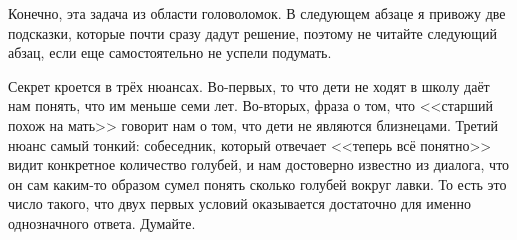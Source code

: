 Конечно, эта задача из области головоломок. В следующем абзаце я привожу две подсказки, которые почти сразу дадут решение, поэтому не читайте следующий абзац, если еще самостоятельно не успели подумать.

Секрет кроется в трёх нюансах. Во-первых, то что дети не ходят в школу даёт нам понять, что им меньше семи лет. Во-вторых, фраза о том, что <<старший похож на мать>> говорит нам о том, что дети не являются близнецами. Третий нюанс самый тонкий: собеседник, который отвечает <<теперь всё понятно>> видит конкретное количество голубей, и нам достоверно известно из диалога, что он сам каким-то образом сумел понять сколько голубей вокруг лавки. То есть это число такого, что двух первых условий оказывается достаточно для именно однозначного ответа. Думайте.